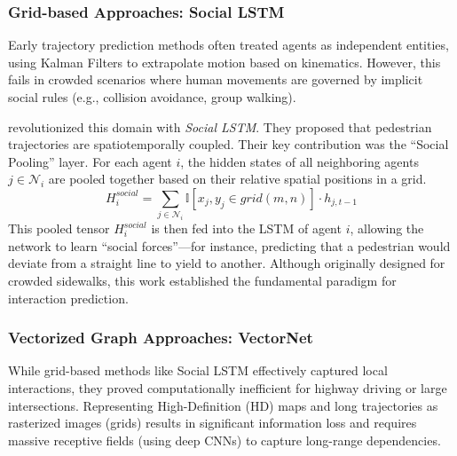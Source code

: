 \documentclass[12pt, a4paper]{article}
\begin{document}
\subsubsection{Grid-based Approaches: Social LSTM}
Early trajectory prediction methods often treated agents as independent entities, using Kalman Filters to extrapolate motion based on kinematics. However, this fails in crowded scenarios where human movements are governed by implicit social rules (e.g., collision avoidance, group walking).

\cite{alahi2016social} revolutionized this domain with \textit{Social LSTM}. They proposed that pedestrian trajectories are spatiotemporally coupled. Their key contribution was the ``Social Pooling'' layer. For each agent $i$, the hidden states of all neighboring agents $j \in \mathcal{N}_i$ are pooled together based on their relative spatial positions in a grid.
\begin{equation}
    H_i^{social} = \sum_{j \in \mathcal{N}_i} \mathbb{I}[x_j, y_j \in grid(m,n)] \cdot h_{j, t-1}
\end{equation}
This pooled tensor $H_i^{social}$ is then fed into the LSTM of agent $i$, allowing the network to learn ``social forces''—for instance, predicting that a pedestrian would deviate from a straight line to yield to another. Although originally designed for crowded sidewalks, this work established the fundamental paradigm for interaction prediction.

\subsubsection{Vectorized Graph Approaches: VectorNet}
While grid-based methods like Social LSTM effectively captured local interactions, they proved computationally inefficient for highway driving or large intersections. Representing High-Definition (HD) maps and long trajectories as rasterized images (grids) results in significant information loss and requires massive receptive fields (using deep CNNs) to capture long-range dependencies.
\end{document}
